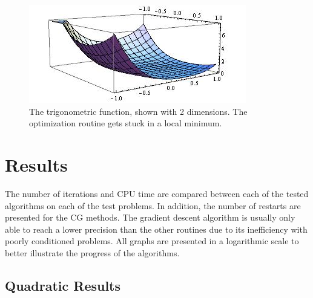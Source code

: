 \documentclass[12pt]{amsart}
\begin{document}
\begin{figure}[thpb]
\centering
\includegraphics[scale=0.60]{images/3dtrig.jpg}
\caption{The trigonometric function, shown with 2 dimensions.  The optimization routine gets stuck in a local minimum.}
\label{fig:3d-trig}
\end{figure}

\section{Results}
The number of iterations and CPU time are compared between each of the tested algorithms on each of the test problems.  In addition, the number of restarts are presented for the CG methods.  The gradient descent algorithm is usually only able to reach a lower precision than the other routines due to its inefficiency with poorly conditioned problems. All graphs are presented in a logarithmic scale to better illustrate the progress of the algorithms.

\subsection{Quadratic Results}
\end{document}
